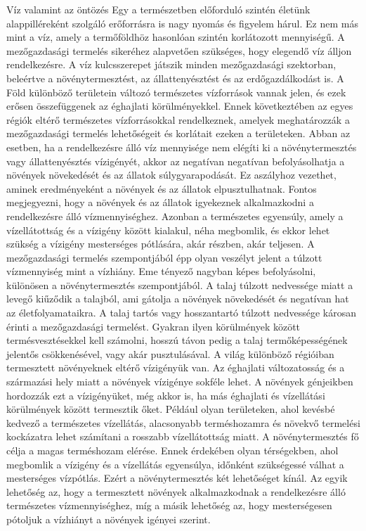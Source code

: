 \documentclass[a4paper,oneside,onecolumn,12pt]{LegrandOrangeBook}
\begin{document}
Víz valamint az öntözés
	Egy a természetben előforduló szintén életünk alappilléreként szolgáló erőforrásra is nagy nyomás és figyelem hárul. Ez nem más mint a víz, amely a termőföldhöz hasonlóan szintén korlátozott mennyiségű. 
	A mezőgazdasági termelés sikeréhez alapvetően szükséges, hogy elegendő víz álljon rendelkezésre. A víz kulcsszerepet játszik minden mezőgazdasági szektorban, beleértve a növénytermesztést, az állattenyésztést és az erdőgazdálkodást is. A Föld különböző területein változó természetes vízforrások vannak jelen, és ezek erősen összefüggenek az éghajlati körülményekkel. Ennek következtében az egyes régiók eltérő természetes vízforrásokkal rendelkeznek, amelyek meghatározzák a mezőgazdasági termelés lehetőségeit és korlátait ezeken a területeken.
	Abban az esetben, ha a rendelkezésre álló víz mennyisége nem elégíti ki a növénytermesztés vagy állattenyésztés vízigényét, akkor az negatívan negatívan befolyásolhatja a növények növekedését és az állatok súlygyarapodását. Ez aszályhoz vezethet, aminek eredményeként a növények és az állatok elpusztulhatnak. Fontos megjegyezni, hogy a növények és az állatok igyekeznek alkalmazkodni a rendelkezésre álló vízmennyiséghez. Azonban a természetes egyensúly, amely a vízellátottság és a vízigény között kialakul, néha megbomlik, és ekkor lehet szükség a vízigény mesterséges pótlására, akár részben, akár teljesen.
	A mezőgazdasági termelés szempontjából épp olyan veszélyt jelent a túlzott vízmennyiség mint a vízhiány. Eme tényező nagyban képes befolyásolni, különösen a növénytermesztés szempontjából. A talaj túlzott nedvessége miatt a levegő kiűződik a talajból, ami gátolja a növények növekedését és negatívan hat az életfolyamataikra. A talaj tartós vagy hosszantartó túlzott nedvessége károsan érinti a mezőgazdasági termelést. Gyakran ilyen körülmények között termésvesztésekkel kell számolni, hosszú távon pedig a talaj termőképességének jelentős csökkenésével, vagy akár pusztulásával.
	A világ különböző régióiban termesztett növényeknek eltérő vízigényük van. Az éghajlati változatosság és a származási hely miatt a növények vízigénye sokféle lehet. A növények génjeikben hordozzák ezt a vízigényüket, még akkor is, ha más éghajlati és vízellátási körülmények között termesztik őket. Például olyan területeken, ahol kevésbé kedvező a természetes vízellátás, alacsonyabb terméshozamra és növekvő termelési kockázatra lehet számítani a rosszabb vízellátottság miatt.
	A növénytermesztés fő célja a magas terméshozam elérése. Ennek érdekében olyan térségekben, ahol megbomlik a vízigény és a vízellátás egyensúlya, időnként szükségessé válhat a mesterséges vízpótlás. Ezért a növénytermesztés két lehetőséget kínál. Az egyik lehetőség az, hogy a termesztett növények alkalmazkodnak a rendelkezésre álló természetes vízmennyiséghez, míg a másik lehetőség az, hogy mesterségesen pótoljuk a vízhiányt a növények igényei szerint.
\end{document}
